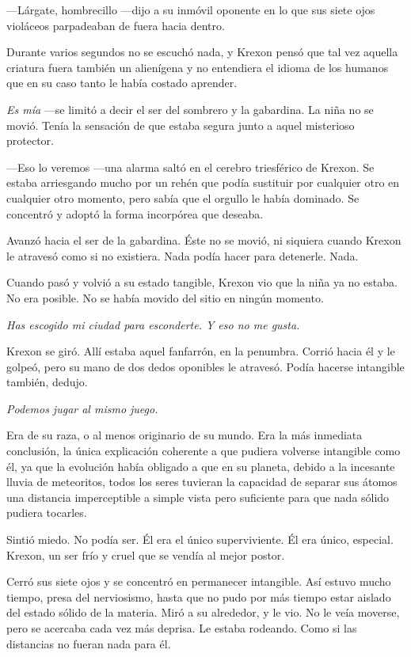 ---Lárgate, hombrecillo ---dijo a su inmóvil oponente en lo que sus siete ojos violáceos parpadeaban de fuera hacia dentro.

Durante varios segundos no se escuchó nada, y Krexon pensó que tal vez aquella criatura fuera también un alienígena y no entendiera el idioma de los humanos que en su caso tanto le había costado aprender.

\emph{Es mía} ---se limitó a decir el ser del sombrero y la gabardina. La niña no se movió. Tenía la sensación de que estaba segura junto a aquel misterioso protector.

---Eso lo veremos ---una alarma saltó en el cerebro triesférico de Krexon. Se estaba arriesgando mucho por un rehén que podía sustituir por cualquier otro en cualquier otro momento, pero sabía que el orgullo le había dominado. Se concentró y adoptó la forma incorpórea que deseaba.

Avanzó hacia el ser de la gabardina. Éste no se movió, ni siquiera cuando Krexon le atravesó como si no existiera. Nada podía hacer para detenerle. Nada.

Cuando pasó y volvió a su estado tangible, Krexon vio que la niña ya no estaba. No era posible. No se había movido del sitio en ningún momento.

\emph{Has escogido mi ciudad para esconderte. Y eso no me gusta.}

Krexon se giró. Allí estaba aquel fanfarrón, en la penumbra. Corrió hacia él y le golpeó, pero su mano de dos dedos oponibles le atravesó. Podía hacerse intangible también, dedujo.

\emph{Podemos jugar al mismo juego.}

Era de su raza, o al menos originario de su mundo. Era la más inmediata conclusión, la única explicación coherente a que pudiera volverse intangible como él, ya que la evolución había obligado a que en su planeta, debido a la incesante lluvia de meteoritos, todos los seres tuvieran la capacidad de separar sus átomos una distancia imperceptible a simple vista pero suficiente para que nada sólido pudiera tocarles.

Sintió miedo. No podía ser. Él era el único superviviente. Él era único, especial. Krexon, un ser frío y cruel que se vendía al mejor postor.

Cerró sus siete ojos y se concentró en permanecer intangible. Así estuvo mucho tiempo, presa del nerviosismo, hasta que no pudo por más tiempo estar aislado del estado sólido de la materia. Miró a su alrededor, y le vio. No le veía moverse, pero se acercaba cada vez más deprisa. Le estaba rodeando. Como si las distancias no fueran nada para él.

